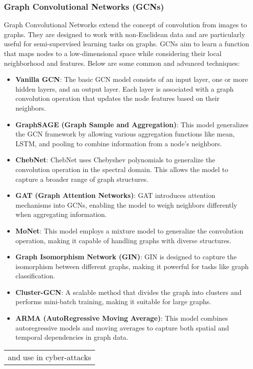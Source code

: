     \subsubsection{Graph Convolutional Networks (GCNs)}
    Graph Convolutional Networks extend the concept of convolution from images to graphs. They are designed to work with non-Euclidean data and are particularly useful for semi-supervised learning tasks on graphs. GCNs aim to learn a function that maps nodes to a low-dimensional space while considering their local neighborhood and features. Below are some common and advanced techniques:

    \begin{itemize}
        \item \textbf{Vanilla GCN}: The basic GCN model consists of an input layer, one or more hidden layers, and an output layer. Each layer is associated with a graph convolution operation that updates the node features based on their neighbors.
        
        \item \textbf{GraphSAGE (Graph Sample and Aggregation)}: This model generalizes the GCN framework by allowing various aggregation functions like mean, LSTM, and pooling to combine information from a node's neighbors.
        
        \item \textbf{ChebNet}: ChebNet uses Chebyshev polynomials to generalize the convolution operation in the spectral domain. This allows the model to capture a broader range of graph structures.
        
        \item \textbf{GAT (Graph Attention Networks)}: GAT introduces attention mechanisms into GCNs, enabling the model to weigh neighbors differently when aggregating information.
        
        \item \textbf{MoNet}: This model employs a mixture model to generalize the convolution operation, making it capable of handling graphs with diverse structures.
        
        \item \textbf{Graph Isomorphism Network (GIN)}: GIN is designed to capture the isomorphism between different graphs, making it powerful for tasks like graph classification.
        
        \item \textbf{Cluster-GCN}: A scalable method that divides the graph into clusters and performs mini-batch training, making it suitable for large graphs.
        
        \item \textbf{ARMA (AutoRegressive Moving Average)}: This model combines autoregressive models and moving averages to capture both spatial and temporal dependencies in graph data.
    \end{itemize}



\begin{table}
\begin{tabular}{l}
and use in cyber-attacks\\
\end{tabular}
\end{table}
